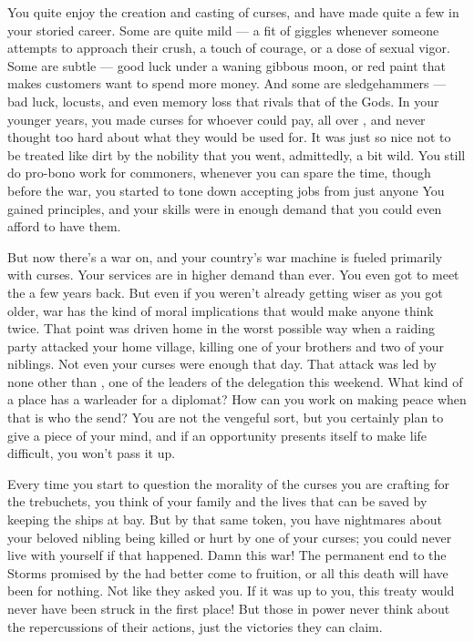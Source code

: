 \documentclass[char]{GL2020}
\begin{document}
You quite enjoy the creation and casting of curses, and have made quite a few in your storied career. Some are quite mild — a fit of giggles whenever someone attempts to approach their crush, a touch of courage, or a dose of sexual vigor. Some are subtle — good luck under a waning gibbous moon, or red paint that makes customers want to spend more money. And some are sledgehammers — bad luck, locusts, and even memory loss that rivals that of the Gods. In your younger years, you made curses for whoever could pay, all over \pEarth{}, and never thought too hard about what they would be used for. It was just so nice not to be treated like dirt by the \pFarm{} nobility that you went, admittedly, a bit wild. You still do pro-bono work for commoners, whenever you can spare the time, though before the war, you started to tone down accepting jobs from just anyone  You gained principles, and your skills were in enough demand that you could even afford to have them.

But now there's a war on, and your country's war machine is fueled primarily with curses. Your services are in higher demand than ever. You even got to meet the \cQueen{\Monarch} a few years back. But even if you weren't already getting wiser as you got older, war has the kind of moral implications that would make anyone think twice. That point was driven home in the worst possible way when a \pShippie{} raiding party attacked your home village, killing one of your brothers and two of your niblings. Not even your curses were enough that day. That attack was led by none other than \cJuniorStatesman{\full}, one of the leaders of the \pShippie{} delegation this weekend. What kind of a place has a warleader for a diplomat? How can you work on making peace when that is who the \pShip{} send? You are not the vengeful sort, but you certainly plan to give \cJuniorStatesman{\them} a piece of your mind, and if an opportunity presents itself to make \cJuniorStatesman{\their} life difficult, you won't pass it up. 

Every time you start to question the morality of the curses you are crafting for the trebuchets, you think of your family and the lives that can be saved by keeping the \pShippie{} ships at bay. But by that same token, you have nightmares about your beloved nibling \cChupLeader{} being killed or hurt by one of your curses; you could never live with yourself if that happened. Damn this war! The permanent end to the Storms promised by the \pTech{} had better come to fruition, or all this death will have been for nothing. Not like they asked you. If it was up to you, this treaty would never have been struck in the first place! But those in power never think about the repercussions of their actions, just the victories they can claim.  
\end{document}
